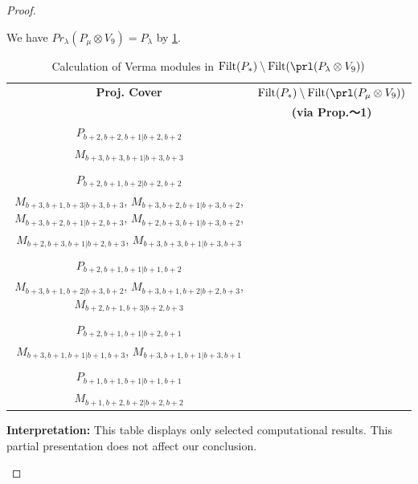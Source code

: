 \begin{proof}
\begin{enumerate}
\begin{enumerate}
\begin{equation}
\end{equation}
       We have $Pr_{\lambda}(P_\mu \otimes V_{9}) = P_\lambda  $ by \cref{tab:verma-analysis_b_11}.
\begin{table}[htbp]
\centering
\caption{Calculation of Verma modules in $\operatorname{Filt}(P_*) \setminus \operatorname{Filt}(\prl(P_\lambda \otimes V_{9})) $ } \label{tab:verma-analysis_b_11}
\begin{tabular}{cc}
\toprule
\textbf{Proj. Cover} & \textbf{$\operatorname{Filt}(P_*) \setminus \operatorname{Filt}(\prl(P_\mu \otimes V_{9})) $}  \\
     & \textbf{(via Prop.～1)}  \\
\midrule
 $P_{b+2,b+2,b+1|b+2,b+2}$ & \makecell{
 $M_{b+3,b+2,b+1|b+2,b+3}$,
 $M_{b+2,b+3,b+1|b+2,b+3}$,
 $M_{b+3,b+2,b+1|b+3,b+2}$,
 $M_{b+2,b+3,b+1|b+3,b+2}$, \\
 $M_{b+3,b+3,b+1|b+3,b+3}$
}\\
 & \\
 $P_{b+2,b+1,b+2|b+2,b+2}$ & \makecell{
 $M_{b+3,b+1,b+2|b+3,b+2}$,
 $M_{b+3,b+1,b+2|b+2,b+3}$,
 $M_{b+2,b+1,b+3|b+3,b+2}$,
 $M_{b+2,b+1,b+3|b+2,b+3}$, \\
 $M_{b+3,b+1,b+3|b+3,b+3}$,
 $M_{b+3,b+2,b+1|b+3,b+2}$,
 $M_{b+3,b+2,b+1|b+2,b+3}$,
 $M_{b+2,b+3,b+1|b+3,b+2}$, \\
 $M_{b+2,b+3,b+1|b+2,b+3}$,
 $M_{b+3,b+3,b+1|b+3,b+3}$
}\\
 & \\
 $P_{b+2,b+1,b+1|b+1,b+2}$ & \makecell{
 $M_{b+3,b+1,b+1|b+1,b+3}$,
 $M_{b+3,b+2,b+1|b+3,b+2}$,
 $M_{b+3,b+2,b+1|b+2,b+3}$,
 $M_{b+2,b+3,b+1|b+2,b+3}$, \\
 $M_{b+3,b+1,b+2|b+3,b+2}$,
 $M_{b+3,b+1,b+2|b+2,b+3}$,
 $M_{b+2,b+1,b+3|b+2,b+3}$
}\\
 & \\
 $P_{b+2,b+1,b+1|b+2,b+1}$ & \makecell{
 $M_{b+3,b+2,b+1|b+2,b+3}$,
 $M_{b+3,b+2,b+1|b+3,b+2}$,
 $M_{b+3,b+1,b+2|b+2,b+3}$,
 $M_{b+3,b+1,b+2|b+3,b+2}$, \\
 $M_{b+3,b+1,b+1|b+1,b+3}$,
 $M_{b+3,b+1,b+1|b+3,b+1}$
}\\
 & \\
 $P_{b+1,b+1,b+1|b+1,b+1}$ & \makecell{
 $M_{b+1,b+2,b+1|b+2,b+1}$,
 $M_{b+1,b+2,b+1|b+1,b+2}$,
 $M_{b+1,b+1,b+2|b+2,b+1}$,
 $M_{b+1,b+1,b+2|b+1,b+2}$, \\
 $M_{b+1,b+2,b+2|b+2,b+2}$
}\\
\bottomrule
\end{tabular}
\vspace{0.5em}
\parbox{\linewidth}{\small
\textbf{Interpretation:}
This table displays only selected computational results. This partial presentation does not affect our conclusion.
}
\end{table}
    \end{enumerate}


\end{enumerate}
\end{proof}
